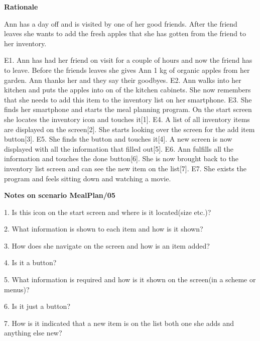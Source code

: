 \textbf{Rationale}

Ann has a day off and is visited by one of her good friends. After the friend leaves she wants to add the fresh apples that she has gotten from the friend to her inventory.

	E1. Ann has had her friend on visit for a couple of hours and now the friend has to leave. Before the friends leaves she gives Ann 1 kg of organic apples from her garden. Ann thanks her and they say their goodbyes.
	E2. Ann walks into her kitchen and puts the apples into on of the kitchen cabinets. She now remembers that she needs to add this item to the inventory list on her smartphone.
	E3. She finds her smartphone and starts the meal planning program. On the start screen she locates the inventory icon and touches it[1].
	E4. A list of all inventory items are displayed on the screen[2]. She starts looking over the screen for the add item button[3].
	E5. She finds the button and touches it[4]. A new screen is now displayed with all the information that filled out[5]. 
	E6. Ann fulfills all the information and touches the done button[6]. She is now brought back to the inventory list screen and can see the new item on the list[7].
	E7. She exists the program and feels sitting down and watching a movie.

\textbf{Notes on scenario MealPlan/05}

1. Is this icon on the start screen and where is it located(size etc.)?

2. What information is shown to each item and how is it shown?

3. How does she navigate on the screen and how is an item added?

4. Is it a button?

5. What information is required and how is it shown on the screen(in a scheme or menus)?

6. Is it just a button?

7. How is it indicated that a new item is on the list both one she adds and anything else new?